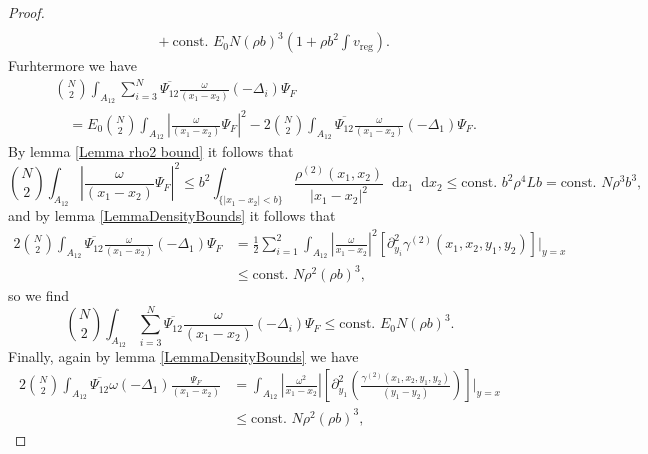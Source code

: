 \documentclass[a4paper,11pt]{article}
\newcommand{\abs}[1]{\left\lvert #1 \right\rvert}
\newcommand*\diff{\mathop{}\!\mathrm{d}}
\numberwithin{equation}{section}
\begin{document}
\begin{proof}
\begin{equation}
\begin{aligned}
		\\&\quad+\text{const. }E_0 N (\rho b)^3 \left(1+\rho b^2\int v_{\text{reg}}\right).
		\end{aligned}
		\end{equation}
		Furhtermore we have \begin{equation}
		\begin{aligned}
		&\binom{N}{2}\int_{A_{12}}\sum_{i=3}^{N} \overline{\Psi_{12}}\frac{\omega}{(x_1-x_2)}(-\Delta_i)\Psi_F\\&\quad=E_0\binom{N}{2}\int_{A_{12}}\left\lvert\frac{\omega}{(x_1-x_2)}\Psi_F\right\rvert^2-2\binom{N}{2}\int_{A_{12}} \overline{\Psi_{12}}\frac{\omega}{(x_1-x_2)}(-\Delta_1)\Psi_F.
		\end{aligned}
		\end{equation}
		By lemma \ref{Lemma rho2 bound} it follows that
		\begin{equation}
		\binom{N}{2}\int_{A_{12}}\left\lvert\frac{\omega}{(x_1-x_2)}\Psi_F\right\rvert^2\leq b^2\int_{\{\abs{x_1-x_2}<b\}} \frac{\rho^{(2)}(x_1,x_2)}{\abs{x_1-x_2}^2}\diff x_1\diff x_2\leq  \text{const. } b^2\rho^4  L b=\text{const. }N\rho^3 b^3,
		\end{equation}
		and by lemma \ref{LemmaDensityBounds} it follows that \begin{equation}
		\begin{aligned}
		2\binom{N}{2}\int_{A_{12}} \overline{\Psi_{12}}\frac{\omega}{(x_1-x_2)}(-\Delta_1)\Psi_F&=\frac12\sum_{i=1}^{2}\int_{A_{12}}\abs{\frac{\omega}{x_1-x_2}}^2\left[\partial^2_{y_i}\gamma^{(2)}(x_1,x_2,y_1,y_2)\right]\Big\rvert_{y=x}\\&\leq \text{const. } N\rho^2(\rho b)^3,
		\end{aligned}
		\end{equation}
		so we find \begin{equation}
		\binom{N}{2}\int_{A_{12}}\sum_{i=3}^{N} \overline{\Psi_{12}}\frac{\omega}{(x_1-x_2)}(-\Delta_i)\Psi_F\leq \text{const. } E_0 N(\rho b)^3.
		\end{equation}
		Finally, again by lemma \ref{LemmaDensityBounds} we have \begin{equation}
		\begin{aligned}
		2\binom{N}{2}\int_{A_{12}}\overline{\Psi_{12}}\omega(-\Delta_1)\frac{\Psi_F}{(x_1-x_2)}&=\int_{A_{12}}\abs{\frac{\omega^2}{x_1-x_2}}\left[\partial^2_{y_1}\left(\frac{\gamma^{(2)}(x_1,x_2,y_1,y_2)}{(y_1-y_2)}\right)\right]\Big\rvert_{y=x}\\&\leq\text{const. }N\rho^2 (\rho b)^3,
		\end{aligned}

\end{equation}
\end{proof}
\end{document}
